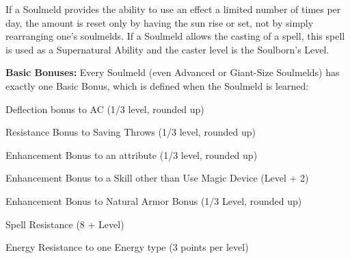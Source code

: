 If a Soulmeld provides the ability to use an effect a limited number of times per day, the amount is reset only by having the sun rise or set, not by simply rearranging one's soulmelds. If a Soulmeld allows the casting of a spell, this spell is used as a Supernatural Ability and the caster level is the Soulborn's Level. 

\textbf{Basic Bonuses:} Every Soulmeld (even Advanced or Giant-Size Soulmelds) has exactly one Basic Bonus, which is defined when the Soulmeld is learned:
\begin{itemize*}
\item Deflection bonus to AC (1/3 level, rounded up) 
\item Resistance Bonus to Saving Throws (1/3 level, rounded up) 
\item Enhancement Bonus to an attribute (1/3 level, rounded up) 
\item Enhancement Bonus to a Skill other than Use Magic Device (Level + 2) 
\item Enhancement Bonus to Natural Armor Bonus (1/3 Level, rounded up) 
\item Spell Resistance (8 + Level) 
\item Energy Resistance to one Energy type (3 points per level)
\end{itemize*}

